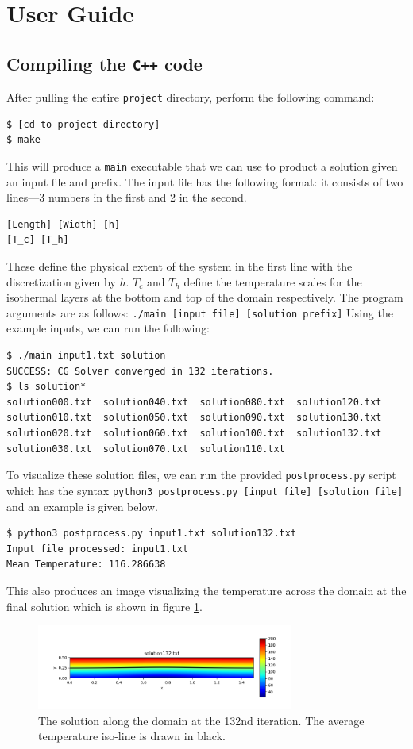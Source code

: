 \documentclass[10pt,a4paper]{article}
\begin{document}
\section*{User Guide}
\subsection*{Compiling the \texttt{C++} code}
After pulling the entire \texttt{project} directory, perform the following command:
\begin{verbatim}
$ [cd to project directory]
$ make
\end{verbatim}
This will produce a \texttt{main} executable that we can use to product a solution given an input file and prefix. The input file has the following format: it consists of two lines---3 numbers in the first and 2 in the second.
\begin{verbatim}
[Length] [Width] [h]
[T_c] [T_h]
\end{verbatim}
These define the physical extent of the system in the first line with the discretization given by $h$. $T_c$ and $T_h$ define the temperature scales for the isothermal layers at the bottom and top of the domain respectively. The program arguments are as follows: \texttt{./main [input file] [solution prefix]}
Using the example inputs, we can run the following:
\begin{verbatim}
$ ./main input1.txt solution
SUCCESS: CG Solver converged in 132 iterations.
$ ls solution*
solution000.txt  solution040.txt  solution080.txt  solution120.txt
solution010.txt  solution050.txt  solution090.txt  solution130.txt
solution020.txt  solution060.txt  solution100.txt  solution132.txt
solution030.txt  solution070.txt  solution110.txt
\end{verbatim}
To visualize these solution files, we can run the provided \texttt{postprocess.py} script which has the syntax \texttt{python3 postprocess.py [input file] [solution file]} and an example is given below.
\begin{verbatim}
$ python3 postprocess.py input1.txt solution132.txt 
Input file processed: input1.txt
Mean Temperature: 116.286638
\end{verbatim}
This also produces an image visualizing the temperature across the domain at the final solution which is shown in figure \ref{sol}. 
\begin{figure}[H]
\centering
\includegraphics[width=0.75\textwidth]{solution132}
\caption{The solution along the domain at the 132nd iteration. The average temperature iso-line is drawn in black. }
\label{sol}
\end{figure}
\end{document}
